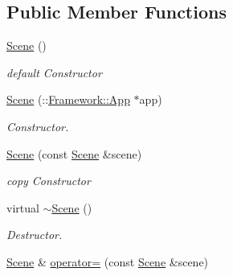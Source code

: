 \subsection*{Public Member Functions}
\begin{DoxyCompactItemize}
\item 
\hypertarget{classContent_1_1Scene_ab2d94decf8888b2cb3a96ea857d5a8cc}{
\hyperlink{classContent_1_1Scene_ab2d94decf8888b2cb3a96ea857d5a8cc}{Scene} ()}
\label{classContent_1_1Scene_ab2d94decf8888b2cb3a96ea857d5a8cc}

\begin{DoxyCompactList}\small\item\em default Constructor \item\end{DoxyCompactList}\item 
\hypertarget{classContent_1_1Scene_a33e133efb78245f9dd8e37100aadb605}{
\hyperlink{classContent_1_1Scene_a33e133efb78245f9dd8e37100aadb605}{Scene} (::\hyperlink{classFramework_1_1App}{Framework::App} $\ast$app)}
\label{classContent_1_1Scene_a33e133efb78245f9dd8e37100aadb605}

\begin{DoxyCompactList}\small\item\em Constructor. \item\end{DoxyCompactList}\item 
\hypertarget{classContent_1_1Scene_acefed292f287f3d0e28b2ed71709f60f}{
\hyperlink{classContent_1_1Scene_acefed292f287f3d0e28b2ed71709f60f}{Scene} (const \hyperlink{classContent_1_1Scene}{Scene} \&scene)}
\label{classContent_1_1Scene_acefed292f287f3d0e28b2ed71709f60f}

\begin{DoxyCompactList}\small\item\em copy Constructor \item\end{DoxyCompactList}\item 
\hypertarget{classContent_1_1Scene_a8425655f3f95feb5bee8965584d0c87c}{
virtual \hyperlink{classContent_1_1Scene_a8425655f3f95feb5bee8965584d0c87c}{$\sim$Scene} ()}
\label{classContent_1_1Scene_a8425655f3f95feb5bee8965584d0c87c}

\begin{DoxyCompactList}\small\item\em Destructor. \item\end{DoxyCompactList}\item 
\hypertarget{classContent_1_1Scene_abb74be668e13bd61a4b31e973685df99}{
\hyperlink{classContent_1_1Scene}{Scene} \& \hyperlink{classContent_1_1Scene_abb74be668e13bd61a4b31e973685df99}{operator=} (const \hyperlink{classContent_1_1Scene}{Scene} \&scene)}
\label{classContent_1_1Scene_abb74be668e13bd61a4b31e973685df99}


\end{DoxyCompactItemize}
